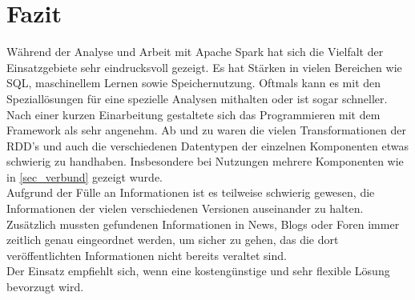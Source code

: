 \newpage
\chapter{Fazit} 

Während der Analyse und Arbeit mit Apache Spark hat sich die Vielfalt der Einsatzgebiete sehr eindrucksvoll gezeigt. Es hat Stärken in vielen Bereichen wie SQL, maschinellem Lernen sowie Speichernutzung. Oftmals kann es mit den Speziallösungen für eine spezielle Analysen mithalten oder ist sogar schneller.\\

\noindent
Nach einer kurzen Einarbeitung gestaltete sich das Programmieren mit dem Framework als sehr angenehm. Ab und zu waren die vielen Transformationen der RDD's und auch die verschiedenen Datentypen der einzelnen Komponenten etwas schwierig zu handhaben. Insbesondere bei Nutzungen mehrere Komponenten wie in \autoref{sec_verbund} gezeigt wurde.\\

\noindent
Aufgrund der Fülle an Informationen ist es teilweise schwierig gewesen, die Informationen der vielen verschiedenen Versionen auseinander zu halten. Zusätzlich mussten gefundenen Informationen in News, Blogs oder Foren immer zeitlich genau eingeordnet werden, um sicher zu gehen, das die dort veröffentlichten Informationen nicht bereits veraltet sind.\\

\noindent
Der Einsatz empfiehlt sich, wenn eine kostengünstige und sehr flexible Lösung bevorzugt wird.